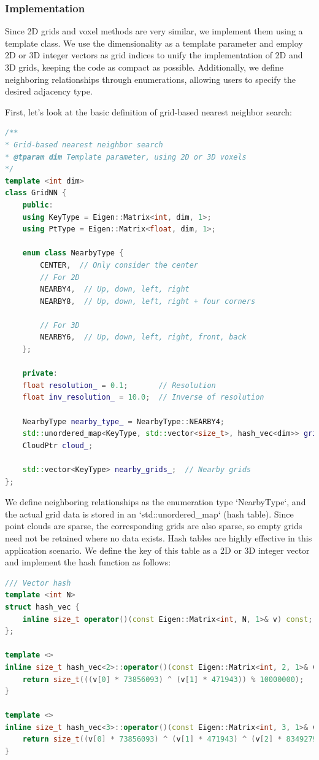 \subsubsection{Implementation}
Since 2D grids and voxel methods are very similar, we implement them using a template class. We use the dimensionality as a template parameter and employ 2D or 3D integer vectors as grid indices to unify the implementation of 2D and 3D grids, keeping the code as compact as possible. Additionally, we define neighboring relationships through enumerations, allowing users to specify the desired adjacency type.

First, let's look at the basic definition of grid-based nearest neighbor search:
\begin{lstlisting}[language=c++,caption=src/ch5/gridnn.hpp]
/**
* Grid-based nearest neighbor search
* @tparam dim Template parameter, using 2D or 3D voxels
*/
template <int dim>
class GridNN {
	public:
	using KeyType = Eigen::Matrix<int, dim, 1>;
	using PtType = Eigen::Matrix<float, dim, 1>;
	
	enum class NearbyType {
		CENTER,  // Only consider the center
		// For 2D
		NEARBY4,  // Up, down, left, right
		NEARBY8,  // Up, down, left, right + four corners
		
		// For 3D
		NEARBY6,  // Up, down, left, right, front, back
	};
	
	private:
	float resolution_ = 0.1;       // Resolution
	float inv_resolution_ = 10.0;  // Inverse of resolution
	
	NearbyType nearby_type_ = NearbyType::NEARBY4;
	std::unordered_map<KeyType, std::vector<size_t>, hash_vec<dim>> grids_;  // Grid data
	CloudPtr cloud_;
	
	std::vector<KeyType> nearby_grids_;  // Nearby grids
};
\end{lstlisting}

We define neighboring relationships as the enumeration type `NearbyType`, and the actual grid data is stored in an `std::unordered_map` (hash table). Since point clouds are sparse, the corresponding grids are also sparse, so empty grids need not be retained where no data exists. Hash tables are highly effective in this application scenario. We define the key of this table as a 2D or 3D integer vector and implement the hash function as follows:

\begin{lstlisting}[language=c++,caption=src/common/eigen\_types.h]
/// Vector hash
template <int N>
struct hash_vec {
	inline size_t operator()(const Eigen::Matrix<int, N, 1>& v) const;
};

template <>
inline size_t hash_vec<2>::operator()(const Eigen::Matrix<int, 2, 1>& v) const {
	return size_t(((v[0] * 73856093) ^ (v[1] * 471943)) % 10000000);
}

template <>
inline size_t hash_vec<3>::operator()(const Eigen::Matrix<int, 3, 1>& v) const {
	return size_t((v[0] * 73856093) ^ (v[1] * 471943) ^ (v[2] * 83492791) % 10000000);
}
\end{lstlisting}

